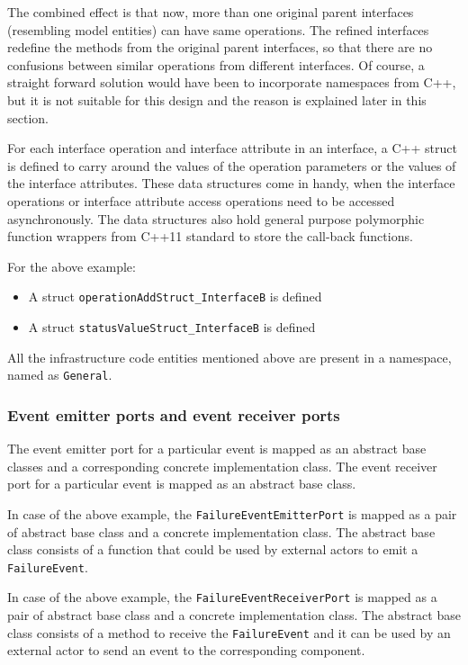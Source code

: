The combined effect is that now, more than one original parent interfaces (resembling model entities) can have same operations. The refined interfaces redefine the methods from the original parent interfaces, so that there are no confusions between similar operations from different interfaces. Of course, a straight forward solution would have been to incorporate namespaces from C++, but it is not suitable for this design and the reason is explained later in this section. 

For each interface operation and interface attribute in an interface, a C++ struct is defined to carry around the values of the operation parameters or the values of the interface attributes. These data structures come in handy, when the interface operations or interface attribute access operations need to be accessed asynchronously. The data structures also hold general purpose polymorphic function wrappers from C++11 standard to store the call-back functions. 

For the above example:
\begin{itemize}
\item A struct \texttt{operationAdd\allowbreak Struct\_\allowbreak InterfaceB} is defined
\item A struct \texttt{statusValue\allowbreak Struct\_\allowbreak InterfaceB} is defined
\end{itemize}  

All the infrastructure code entities mentioned above are present in a namespace, named as \texttt{General}.

\subsubsection{\textbf{Event emitter ports and event receiver ports}}
The event emitter port for a particular event is mapped as an abstract base classes and a corresponding concrete implementation class. The event receiver port for a particular event is mapped as an abstract base class.  

In case of the above example, the \texttt{FailureEvent\allowbreak EmitterPort} is mapped as a pair of abstract base class and a concrete implementation class. The abstract base class consists of a function that could be used by external actors to emit a \texttt{FailureEvent}.  

In case of the above example, the \texttt{FailureEvent\allowbreak ReceiverPort} is mapped as a pair of abstract base class and a concrete implementation class. The abstract base class consists of a method to receive the \texttt{FailureEvent} and it can be used by an external actor to send an event to the corresponding component.


